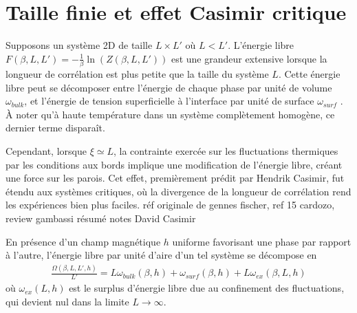     \section{Taille finie et effet Casimir critique}
    \label{sec-casimir}    
    
Supposons un système 2D de taille $L \times L' $ où $L \less L'$. L'énergie libre $F(\beta,L,L') = - \frac{1}{\beta} \ln ( Z(\beta,L,L'))$ est une grandeur extensive lorsque la longueur de corrélation est plus petite que la taille du système $L$. 
Cette énergie libre peut se décomposer entre l'énergie de chaque phase par unité de volume $\omega_{bulk}$, et l'énergie de tension superficielle à l'interface par unité de surface $\omega_{surf}$ \cite{cardozo_finite_2015,lopes_cardozo_critical_2014}. À noter qu'à haute température dans un système complètement homogène, ce dernier terme disparaît.

Cependant, lorsque $\xi \simeq L$, la contrainte exercée sur les fluctuations thermiques par les conditions aux bords implique une modification de l'énergie libre, créant une force sur les parois. Cet effet, premièrement prédit par Hendrik Casimir\cite{h_b_g_casimir_attraction_1948}, fut étendu aux systèmes critiques, où la divergence de la longueur de corrélation rend les expériences bien plus faciles\cite{nguyen_controlling_2013}.
{\color{red} réf originale de gennes fischer, ref 15 cardozo, review gambassi}
{\color{red} résumé notes David Casimir}

En présence d'un champ magnétique $h$ uniforme favorisant une phase par rapport à l'autre, l'énergie libre par unité d'aire d'un tel système se décompose \cite{lopes_cardozo_critical_2014,cardozo_finite_2015} en 
\begin{align}
    \frac{\Omega(\beta,L,L',h)}{L'} = L \omega_{bulk}(\beta,h) + \omega_{surf}(\beta,h) + L \omega_{ex}(\beta,L,h)
    \label{decomposition-energie}
\end{align}
où $\omega_{ex}(L,h)$ est le surplus d'énergie libre due au confinement des fluctuations, qui devient nul dans la limite $L\to \infty$.

